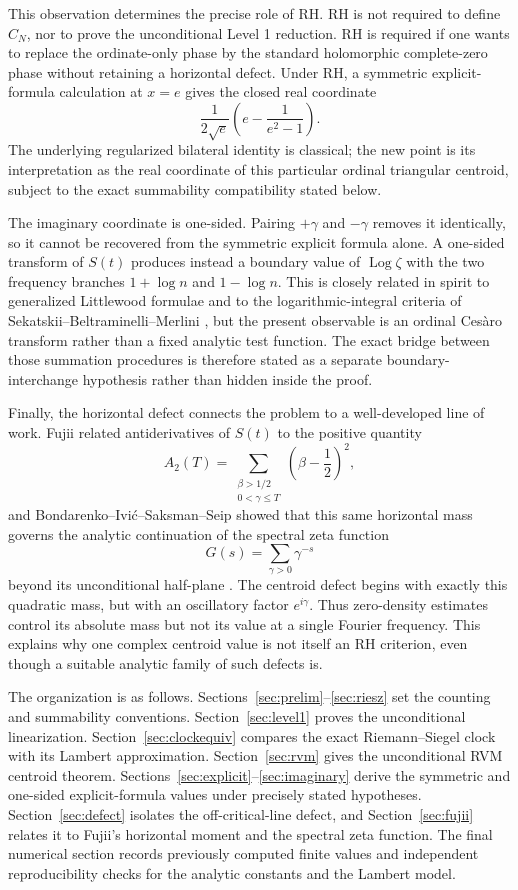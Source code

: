 \documentclass[11pt]{article}
\theoremstyle{definition}
\theoremstyle{remark}
\newcommand{\Log}{\operatorname{Log}}
\begin{document}
This observation determines the precise role of RH.  RH is not required to define $C_N$, nor to prove the unconditional Level 1 reduction.  RH is required if one wants to replace the ordinate-only phase by the standard holomorphic complete-zero phase without retaining a horizontal defect.  Under RH, a symmetric explicit-formula calculation at $x=e$ gives the closed real coordinate
\[
\frac{1}{2\sqrt e}\left(e-\frac1{e^2-1}\right).
\]
The underlying regularized bilateral identity is classical; the new point is its interpretation as the real coordinate of this particular ordinal triangular centroid, subject to the exact summability compatibility stated below.

The imaginary coordinate is one-sided.  Pairing $+\gamma$ and $-\gamma$ removes it identically, so it cannot be recovered from the symmetric explicit formula alone.  A one-sided transform of $S(t)$ produces instead a boundary value of $\Log\zeta$ with the two frequency branches $1+\log n$ and $1-\log n$.  This is closely related in spirit to generalized Littlewood formulae and to the logarithmic-integral criteria of Sekatskii--Beltraminelli--Merlini \cite{Sekatskii2008,Sekatskii2009,Sekatskii2010}, but the present observable is an ordinal Cesàro transform rather than a fixed analytic test function.  The exact bridge between those summation procedures is therefore stated as a separate boundary-interchange hypothesis rather than hidden inside the proof.

Finally, the horizontal defect connects the problem to a well-developed line of work.  Fujii related antiderivatives of $S(t)$ to the positive quantity
\[
A_2(T)=\sum_{\substack{\beta>1/2\\0<\gamma\leq T}}
\left(\beta-\frac12\right)^2,
\]
and Bondarenko--Ivić--Saksman--Seip showed that this same horizontal mass governs the analytic continuation of the spectral zeta function
\[
G(s)=\sum_{\gamma>0}\gamma^{-s}
\]
beyond its unconditional half-plane \cite{Fujii2002,BondarenkoIvicSaksmanSeip2019}.  The centroid defect begins with exactly this quadratic mass, but with an oscillatory factor $e^{i\gamma}$.  Thus zero-density estimates control its absolute mass but not its value at a single Fourier frequency.  This explains why one complex centroid value is not itself an RH criterion, even though a suitable analytic family of such defects is.

The organization is as follows.  Sections~\ref{sec:prelim}--\ref{sec:riesz} set the counting and summability conventions.  Section~\ref{sec:level1} proves the unconditional linearization.  Section~\ref{sec:clockequiv} compares the exact Riemann--Siegel clock with its Lambert approximation.  Section~\ref{sec:rvm} gives the unconditional RVM centroid theorem.  Sections~\ref{sec:explicit}--\ref{sec:imaginary} derive the symmetric and one-sided explicit-formula values under precisely stated hypotheses.  Section~\ref{sec:defect} isolates the off-critical-line defect, and Section~\ref{sec:fujii} relates it to Fujii's horizontal moment and the spectral zeta function.  The final numerical section records previously computed finite values and independent reproducibility checks for the analytic constants and the Lambert model.
\end{document}
